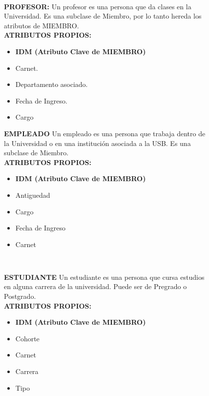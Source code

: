 \documentclass{article}
\begin{document}
\begin{figure}[h]
\begin{itemize}
\end{itemize} \\
\newline
{\bf{PROFESOR:}}
	Un profesor es una persona que da clases en la Universidad. Es una subclase de Miembro, por lo tanto hereda los atributos de MIEMBRO.\\
\newline
{\bf{ATRIBUTOS PROPIOS:}}
\newline
\begin{itemize}
 \item {\bf{IDM (Atributo Clave de MIEMBRO)}}
\item Carnet.
\item Departamento asociado.
\item Fecha de Ingreso.
\item Cargo
\end{itemize}
\newline
{\bf{EMPLEADO}}
Un empleado es una persona que trabaja dentro de la Universidad o en una instituci\'on asociada a la USB. Es una subclase de Miembro.\\

\newline
{\bf{ATRIBUTOS PROPIOS:}}
\newline
\begin{itemize}
 \item {\bf{IDM (Atributo Clave de MIEMBRO)}}
\item  Antig\¨uedad 
\item Cargo
\item Fecha de Ingreso
\item Carnet
\end{itemize}\\
\newline

{\bf{ESTUDIANTE}}
	Un estudiante es una persona que cursa estudios en alguna carrera de la universidad. Puede ser de Pregrado o Postgrado. \\
\newline
{\bf{ATRIBUTOS PROPIOS:}}
\newline
\begin{itemize}
 \item {\bf{IDM (Atributo Clave de MIEMBRO)}}
\item Cohorte
\item Carnet
\item Carrera
\item Tipo
\end{itemize}\\
\newline



\end{figure}
\end{document}
